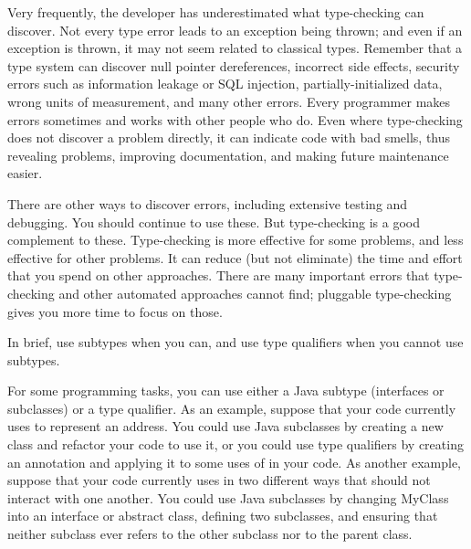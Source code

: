 Very frequently, the developer has underestimated what type-checking can
discover.  Not every type error leads to an exception being thrown; and
even if an exception is thrown, it may not seem related to classical types.
Remember that a type system can discover
null pointer dereferences,
incorrect side effects,
security errors such as information leakage or SQL injection,
partially-initialized data,
wrong units of measurement,
and many other errors.
Every programmer makes errors sometimes and works with other people
who do.
Even where type-checking does not discover a
problem directly, it can indicate code with bad smells, thus revealing
problems, improving documentation, and making future maintenance easier.

There are other ways to discover errors, including extensive testing and
debugging.  You should continue to use these.
But type-checking is a good complement to these.  Type-checking is more
effective for some problems, and less effective for other problems.  It can
reduce (but not eliminate) the time and effort that you spend on other
approaches.  There are many important errors that type-checking and other
automated approaches cannot find; pluggable type-checking gives you more
time to focus on those.



\label{when-to-use-type-qualifiers}
\label{faq-qualifiers-vs-subclasses}

In brief, use subtypes when you can, and use type qualifiers when you cannot
use subtypes.

For some programming tasks, you can use either a Java subtype (interfaces
or subclasses) or a type
qualifier.  As an example, suppose that your code currently uses  to
represent an address.  You could use Java subclasses by creating a new
 class and refactor your code to use it, or you could use
type qualifiers by creating an  annotation and applying it
to some uses of  in your code.  As another example, suppose
that your code currently uses  in two different ways that
should not interact with one another.  You could use Java subclasses by
changing MyClass into an interface or abstract class, defining two
subclasses, and ensuring that neither subclass ever refers to the other
subclass nor to the parent class.

